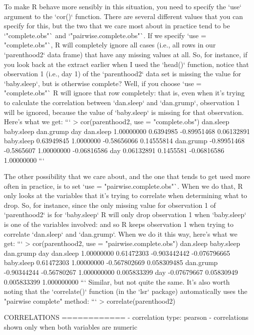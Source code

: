 To make R behave more sensibly in this situation, you need to specify the `use` argument to the `cor()` function. There are several different values that you can specify for this, but the two that we care most about in practice tend to be `"complete.obs"` and `"pairwise.complete.obs"`. If we specify `use = "complete.obs"`, R will completely ignore all cases (i.e., all rows in our `parenthood2` data frame) that have any missing values at all. So, for instance, if you look back at the extract earlier when I used the `head()` function, notice that observation 1 (i.e., day 1) of the `parenthood2` data set is missing the value for `baby.sleep`, but is otherwise complete? Well, if you choose `use = "complete.obs"` R will ignore that row completely: that is, even when it's trying to calculate the correlation between `dan.sleep` and `dan.grump`, observation 1 will be ignored, because the value of `baby.sleep` is missing for that observation. Here's what we get:
```
> cor(parenthood2, use = "complete.obs")
             dan.sleep baby.sleep   dan.grump         day
dan.sleep   1.00000000  0.6394985 -0.89951468  0.06132891
baby.sleep  0.63949845  1.0000000 -0.58656066  0.14555814
dan.grump  -0.89951468 -0.5865607  1.00000000 -0.06816586
day         0.06132891  0.1455581 -0.06816586  1.00000000
```



The other possibility that we care about, and the one that tends to get used more often in practice, is to set `use = "pairwise.complete.obs"`. When we do that, R only looks at the variables that it's trying to correlate when determining what to drop. So, for instance, since the only missing value for observation 1 of `parenthood2` is for `baby.sleep` R will only drop observation 1 when `baby.sleep` is one of the variables involved: and so R keeps observation 1 when trying to correlate  `dan.sleep` and `dan.grump`. When we do it this way, here's what we get:
```
> cor(parenthood2, use = "pairwise.complete.obs") 
             dan.sleep  baby.sleep    dan.grump          day
dan.sleep   1.00000000  0.61472303 -0.903442442 -0.076796665
baby.sleep  0.61472303  1.00000000 -0.567802669  0.058309485
dan.grump  -0.90344244 -0.56780267  1.000000000  0.005833399
day        -0.07679667  0.05830949  0.005833399  1.000000000
```
Similar, but not quite the same. It's also worth noting that the `correlate()` function (in the `lsr` package) automatically uses the "pairwise complete" method:
```
> correlate(parenthood2)

CORRELATIONS
============
- correlation type:  pearson 
- correlations shown only when both variables are numeric

